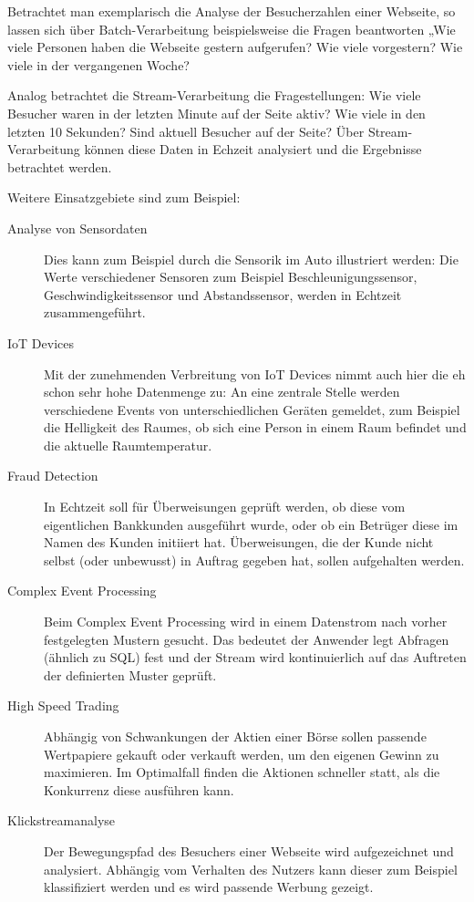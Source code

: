 \documentclass[a4paper,11pt]{scrartcl}
\begin{document}
  Betrachtet man exemplarisch die Analyse der Besucherzahlen einer Webseite, so
  lassen sich über Batch-Verarbeitung beispielsweise die Fragen beantworten „Wie
  viele Personen haben die Webseite gestern aufgerufen? Wie viele vorgestern?
  Wie viele in der vergangenen Woche?

  Analog betrachtet die Stream-Verarbeitung die Fragestellungen: Wie viele
  Besucher waren in der letzten Minute auf der Seite aktiv? Wie viele in den
  letzten 10 Sekunden? Sind aktuell Besucher auf der Seite? Über
  Stream-Verarbeitung können diese Daten in Echzeit analysiert und die Ergebnisse
  betrachtet werden.

  Weitere Einsatzgebiete sind zum Beispiel:
  \begin{description}
    \item[Analyse von Sensordaten] Dies kann zum Beispiel durch die Sensorik im
      Auto illustriert werden: Die Werte verschiedener Sensoren zum Beispiel
      Beschleunigungssensor, Geschwindigkeitssensor und Abstandssensor, werden in
      Echtzeit zusammengeführt.
    \item[IoT Devices] Mit der zunehmenden Verbreitung von IoT Devices nimmt auch
      hier die eh schon sehr hohe Datenmenge zu: An eine zentrale Stelle werden
      verschiedene Events von unterschiedlichen Geräten gemeldet, zum Beispiel
      die Helligkeit des Raumes, ob sich eine Person in einem Raum befindet und
      die aktuelle Raumtemperatur.
    \item[Fraud Detection] In Echtzeit soll für Überweisungen geprüft werden, ob
      diese vom eigentlichen Bankkunden ausgeführt wurde, oder ob ein Betrüger
      diese im Namen des Kunden initiiert hat. Überweisungen, die der Kunde nicht
      selbst (oder unbewusst) in Auftrag gegeben hat, sollen aufgehalten werden.
    \item[Complex Event Processing] Beim Complex Event Processing wird in einem
      Datenstrom nach vorher festgelegten Mustern gesucht. Das bedeutet der
      Anwender legt Abfragen (ähnlich zu SQL) fest und der Stream wird
      kontinuierlich auf das Auftreten der definierten Muster geprüft.
    \item[High Speed Trading] Abhängig von Schwankungen der Aktien einer Börse
      sollen passende Wertpapiere gekauft oder verkauft werden, um den eigenen
      Gewinn zu maximieren. Im Optimalfall finden die Aktionen schneller statt,
      als die Konkurrenz diese ausführen kann.
    \item[Klickstreamanalyse] Der Bewegungspfad des Besuchers einer Webseite wird
      aufgezeichnet und analysiert. Abhängig vom Verhalten des Nutzers kann
      dieser zum Beispiel klassifiziert werden und es wird passende Werbung
      gezeigt.
  \end{description}
\end{document}
